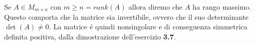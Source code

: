 Se $A \in M_{m \times n}$ con $m \geq n = rank(A)$ allora diremo che $A$ ha rango massimo.
\\
Questo comporta che la matrice sia invertibile, ovvero che il suo determinante $\det(A) \neq 0$. La matrice \'e quindi nonsingolare e di conseguenza simmetrica definita positiva, dalla dimostrazione dell'esercizio \textbf{3.7}.